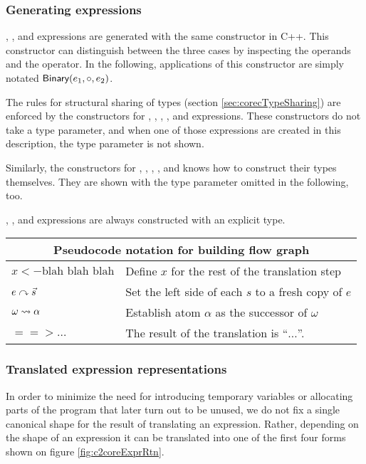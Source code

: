 \begin{docpart}
\subsubsection{Generating \coreC expressions}
, , and  expressions
are generated with the same constructor in C++. This constructor
can distinguish between the three cases by inspecting the
operands and the operator. In the following, applications
of this constructor are simply notated $\textsf{Binary}(e_1,\circ,e_2)$.

The rules for structural sharing of types (section
\ref{sec:corecTypeSharing}) are enforced by the constructors for
, , , , and
 expressions. These constructors do not take a type
parameter, and when one of those expressions are created in
this description, the type parameter is not shown.

Similarly, the constructors for , ,
, , and  knows
how to construct their types themselves. They are shown with
the type parameter omitted in the following, too.

, , and  expressions are
always constructed with an explicit \coreC type.

\bigskip

\noindent\begin{tabular}{|l|l|}
\hline
\multicolumn{2}{|c|}{Pseudocode notation for building flow graph} \\
\hline
\hline
$x <- \mbox{blah blah blah}$
        & Define $x$ for the rest of the translation step \\
${e}\curvearrowright{\vec s}$
        & Set the left side of each $s$ to a fresh copy of $e$ \\
${\omega}\rightsquigarrow{\alpha}$
        & Establish atom $\alpha$ as the successor of $\omega$ \\
$==> \ldots$
        & The result of the translation is ``$\ldots$''. \\
\hline
\end{tabular}

\subsubsection{Translated expression representations}
\label{sec:c2coreExprRtn}
In order to minimize the need for introducing temporary
variables or allocating parts of the \coreC program that
later turn out to be unused, we do not fix a single canonical
shape for the result of translating an expression. Rather,
depending on the shape of an expression it can be translated
into one of the first four forms shown on figure \vref{fig:c2coreExprRtn}.


\end{docpart}
